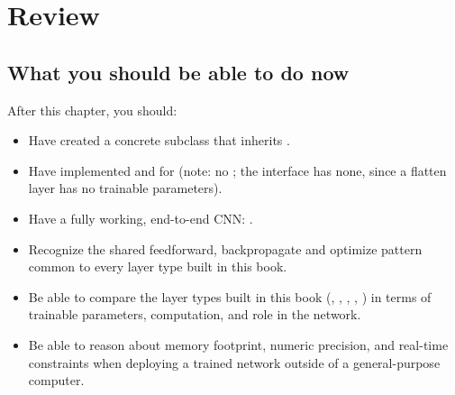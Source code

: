 
\section{Review}
\label{c10:sec:review}

\subsection*{What you should be able to do now}
After this chapter, you should:
\begin{itemize}
  \item Have created a concrete subclass  that inherits
    .
  \item Have implemented  and  for  (note:
    no ; the interface has none, since a flatten layer has no trainable
    parameters).
  \item Have a fully working, end-to-end CNN:
    .
  \item Recognize the shared feedforward, backpropagate and optimize pattern common to every layer
    type built in this book.
  \item Be able to compare the layer types built in this book (, ,
    , , ) in terms of trainable parameters, computation, and
    role in the network.
  \item Be able to reason about memory footprint, numeric precision, and real-time constraints when
    deploying a trained network outside of a general-purpose computer.
\end{itemize}

